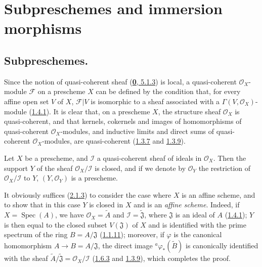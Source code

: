 \section{Subpreschemes and immersion morphisms}
\label{section:I.4}

\subsection{Subpreschemes.}
\label{subsection:I.4.1}

\begin{env}[4.1.1]
\label{I.4.1.1}
Since the notion of quasi-coherent sheaf
(\hyperref[0.5.1.3]{\textbf{0}, 5.1.3}) is local, a
quasi-coherent $\mathscr{O}_X$-module $\mathscr{F}$ on a prescheme $X$ can
be defined by the condition that, for every affine open set $V$ of $X$,
$\mathscr{F}|V$ is isomorphic to a sheaf associated with a
$\Gamma(V,\mathscr{O}_X)$-module (\hyperref[I.1.4.1]{1.4.1}). It is clear
that, on a prescheme $X$, the structure sheaf $\mathscr{O}_X$ is
quasi-coherent, and that kernels, cokernels and images of homomorphisms of
quasi-coherent $\mathscr{O}_X$-modules, and inductive limits and direct sums
of quasi-coherent $\mathscr{O}_X$-modules, are quasi-coherent
(\hyperref[I.1.3.7]{1.3.7} and \hyperref[I.1.3.9]{1.3.9}).
\end{env}

\begin{proposition}[4.1.2]
\label{I.4.1.2}
Let $X$ be a prescheme, and $\mathscr{I}$ a quasi-coherent sheaf of ideals
in $\mathscr{O}_X$. Then the support $Y$ of the sheaf
$\mathscr{O}_X/\mathscr{I}$ is closed, and if we denote by
$\mathscr{O}_Y$ the restriction of $\mathscr{O}_X/\mathscr{I}$ to $Y$,
$(Y,\mathscr{O}_Y)$ is a prescheme.
\end{proposition}

It obviously suffices (\hyperref[I.2.1.3]{2.1.3}) to consider the case where
$X$ is an affine scheme, and to show that in this case $Y$ is closed in
$X$ and is an \emph{affine scheme}. Indeed, if
$X=\operatorname{Spec}(A)$, we have $\mathscr{O}_X=\widetilde{A}$ and
$\mathscr{I}=\widetilde{\mathfrak{J}}$, where $\mathfrak{J}$ is an ideal of
$A$ (\hyperref[I.1.4.1]{1.4.1}); $Y$ is then equal to the closed subset
$V(\mathfrak{J})$ of $X$ and is identified with the prime spectrum of the ring
$B=A/\mathfrak{J}$ (\hyperref[I.1.1.11]{1.1.11}); moreover, if $\varphi$
is the canonical homomorphism $A\to B=A/\mathfrak{J}$, the direct image
${}^a\varphi_*(\widetilde{B})$ is canonically identified with the sheaf
$\widetilde{A}/\widetilde{\mathfrak{J}}=\mathscr{O}_X/\mathscr{I}$
(\hyperref[I.1.6.3]{1.6.3} and \hyperref[I.1.3.9]{1.3.9}), which completes
the proof.

